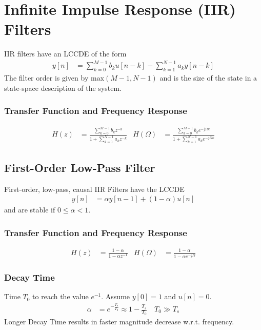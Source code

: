 \section{Infinite Impulse Response (IIR) Filters}
IIR filters have an LCCDE of the form
\begin{align*}
	y[n] &= \sum_{k=0}^{M-1} b_ku[n-k]-\sum_{k=1}^{N-1} a_k y[n-k]
\end{align*}
The filter order is given by $\text{max}(M-1,N-1)$ and is the size of the state in a state-space description of the system.

\subsubsection{Transfer Function and Frequency Response}
\vspace{-1em}
\begin{align*}
	H(z) &= \frac{\sum_{k=0}^{M-1}b_kz^{-k}}{1+\sum_{k=1}^{N-1}a_kz^{-k}} & H(\Omega) &= \frac{\sum_{k=0}^{M-1}b_ke^{-j\Omega k}}{1+\sum_{k=1}^{N-1}a_ke^{-j\Omega k}}
\end{align*}

\subsection{First-Order Low-Pass Filter}
First-order, low-pass, causal IIR Filters have the LCCDE
\begin{align*}
	y[n] &= \alpha y[n-1] + (1-\alpha)u[n]
\end{align*}
and are stable if $0\leq \alpha < 1$.

\subsubsection{Transfer Function and Frequency Response}
\vspace{-1em}
\begin{align*}
	H(z) &= \frac{1-\alpha}{1-\alpha z^{-1}} & H(\Omega) &= \frac{1-\alpha}{1-\alpha e^{-j\Omega}}
\end{align*}

\subsubsection{Decay Time}
Time $T_0$ to reach the value $e^{-1}$. Assume $y[0] = 1$ and $u[n] = 0$.
\begin{align*}
	\alpha &= e^{-\frac{T_s}{T_0}} \approx 1-\frac{T_s}{T_0} \quad T_0\gg T_s
\end{align*}
Longer Decay Time results in faster magnitude decrease w.r.t. frequency.

